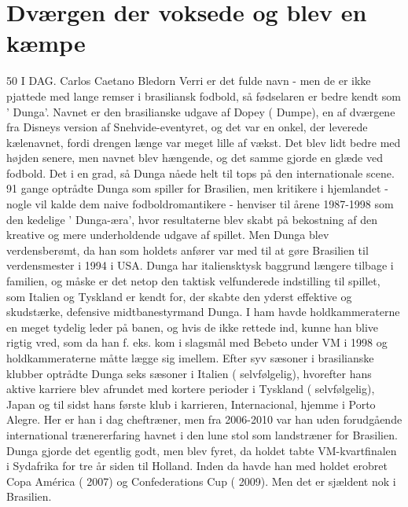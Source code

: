 \section{Dværgen der voksede og blev en kæmpe}
\label{JPPOLSameContent1}
50 I DAG. Carlos Caetano Bledorn Verri er det fulde navn - men de er ikke pjattede med lange remser i brasiliansk fodbold, så fødselaren er bedre kendt som ' Dunga'. Navnet er den brasilianske udgave af Dopey ( Dumpe), en af dværgene fra Disneys version af Snehvide-eventyret, og det var en onkel, der leverede kælenavnet, fordi drengen længe var meget lille af vækst. Det blev lidt bedre med højden senere, men navnet blev hængende, og det samme gjorde en glæde ved fodbold. Det i en grad, så Dunga nåede helt til tops på den internationale scene. 91 gange optrådte Dunga som spiller for Brasilien, men kritikere i hjemlandet - nogle vil kalde dem naive fodboldromantikere - henviser til årene 1987-1998 som den kedelige ' Dunga-æra', hvor resultaterne blev skabt på bekostning af den kreative og mere underholdende udgave af spillet. Men Dunga blev verdensberømt, da han som holdets anfører var med til at gøre Brasilien til verdensmester i 1994 i USA. Dunga har italiensktysk baggrund længere tilbage i familien, og måske er det netop den taktisk velfunderede indstilling til spillet, som Italien og Tyskland er kendt for, der skabte den yderst effektive og skudstærke, defensive midtbanestyrmand Dunga. I ham havde holdkammeraterne en meget tydelig leder på banen, og hvis de ikke rettede ind, kunne han blive rigtig vred, som da han f. eks. kom i slagsmål med Bebeto under VM i 1998 og holdkammeraterne måtte lægge sig imellem. Efter syv sæsoner i brasilianske klubber optrådte Dunga seks sæsoner i Italien ( selvfølgelig), hvorefter hans aktive karriere blev afrundet med kortere perioder i Tyskland ( selvfølgelig), Japan og til sidst hans første klub i karrieren, Internacional, hjemme i Porto Alegre. Her er han i dag cheftræner, men fra 2006-2010 var han uden forudgående international trænererfaring havnet i den lune stol som landstræner for Brasilien. Dunga gjorde det egentlig godt, men blev fyret, da holdet tabte VM-kvartfinalen i Sydafrika for tre år siden til Holland. Inden da havde han med holdet erobret Copa América ( 2007) og Confederations Cup ( 2009). Men det er sjældent nok i Brasilien.

